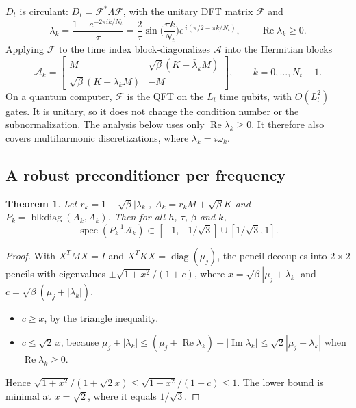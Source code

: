 \documentclass[11pt,a4paper]{article}
\newcommand{\A}{\mathcal{A}}
\newtheorem{theorem}{Theorem}[section]
\theoremstyle{remark}
\begin{document}
$D_t$ is circulant: $D_t=\mathcal F^*\Lambda\mathcal F$, with the unitary DFT matrix $\mathcal F$
and
\begin{equation}\label{eq:lamk}
\lambda_k=\frac{1-e^{-2\pi ik/N_t}}{\tau}=\frac2\tau\sin\Big(\frac{\pi k}{N_t}\Big)e^{\,i(\pi/2-\pi k/N_t)},
\qquad\operatorname{Re}\lambda_k\ge0 .
\end{equation}
Applying $\mathcal F$ to the time index block-diagonalizes $\A$ into the Hermitian
blocks
\begin{equation}\label{eq:Ak}
\A_k=\begin{bmatrix}M & \sqrt\beta(K+\bar\lambda_kM)\\ \sqrt\beta(K+\lambda_kM) & -M\end{bmatrix},\qquad k=0,\dots,N_t-1 .
\end{equation}
On a quantum computer, $\mathcal F$ is the QFT on the $L_t$ time qubits, with
$O(L_t^2)$ gates. It is unitary, so it does not change the condition number
or the subnormalization. The analysis below uses only $\operatorname{Re}\lambda_k\ge0$. It
therefore also covers multiharmonic discretizations, where $\lambda_k=i\omega_k$.

\subsection{A robust preconditioner per frequency}

\begin{theorem}\label{thm:heatsz}
Let $r_k=1+\sqrt\beta|\lambda_k|$, $A_k=r_kM+\sqrt\beta K$ and $P_k=\operatorname{blkdiag}(A_k,A_k)$.
Then for all $h$, $\tau$, $\beta$ and $k$,
\[
\operatorname{spec}(P_k^{-1}\A_k)\subset[-1,-1/\sqrt3]\cup[1/\sqrt3,1].
\]
\end{theorem}
\begin{proof}
With $X^TMX=I$ and $X^TKX=\operatorname{diag}(\mu_j)$, the pencil decouples into
$2\times2$ pencils with eigenvalues $\pm\sqrt{1+x^2}/(1+c)$, where
$x=\sqrt\beta|\mu_j+\lambda_k|$ and $c=\sqrt\beta(\mu_j+|\lambda_k|)$.
\begin{itemize}
\item $c\ge x$, by the triangle inequality.
\item $c\le\sqrt2\,x$, because $\mu_j+|\lambda_k|\le(\mu_j+\operatorname{Re}\lambda_k)+|\operatorname{Im}\lambda_k|\le\sqrt2|\mu_j+\lambda_k|$
  when $\operatorname{Re}\lambda_k\ge0$.
\end{itemize}
Hence $\sqrt{1+x^2}/(1+\sqrt2x)\le\sqrt{1+x^2}/(1+c)\le1$. The lower bound is
minimal at $x=\sqrt2$, where it equals $1/\sqrt3$.
\end{proof}
\end{document}
